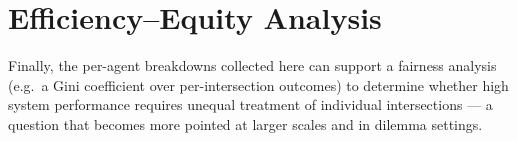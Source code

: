\section{Efficiency--Equity Analysis}
Finally, the per-agent breakdowns collected here can support a fairness analysis
(e.g.\ a Gini coefficient over per-intersection outcomes) to determine whether high
system performance requires unequal treatment of individual intersections --- a
question that becomes more pointed at larger scales and in dilemma settings.
